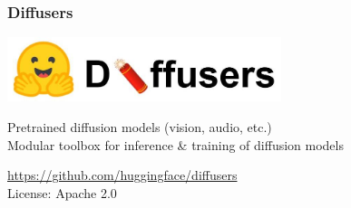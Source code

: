 \documentclass[17pt,aspectratio=169,hyperref={pdfusetitle,colorlinks,allcolors=olive}]{beamer}
\begin{document}
\begin{frame}[fragile]
  \frametitle{Diffusers}

  \begin{center}
    \includegraphics[width=8cm]{figs/diffusers}
  \end{center}

  Pretrained diffusion models (vision, audio, etc.) \\
  Modular toolbox for inference \& training of diffusion models \\


  \begin{flushright}
    {\small
      \url{https://github.com/huggingface/diffusers} \\
      License: Apache 2.0 \\
    }
  \end{flushright}
\end{frame}
\end{document}
